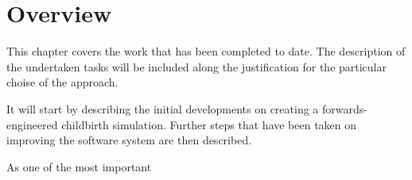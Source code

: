 \section{Overview}\label{methodology-overview}

This chapter covers the work that has been completed to date. The description of the undertaken tasks will be included along the justification for the particular choise of the approach.

It will start by describing the initial developments on creating a forwards-engineered childbirth simulation. Further steps that have been taken on improving the software system are then described.

As one of the most important
